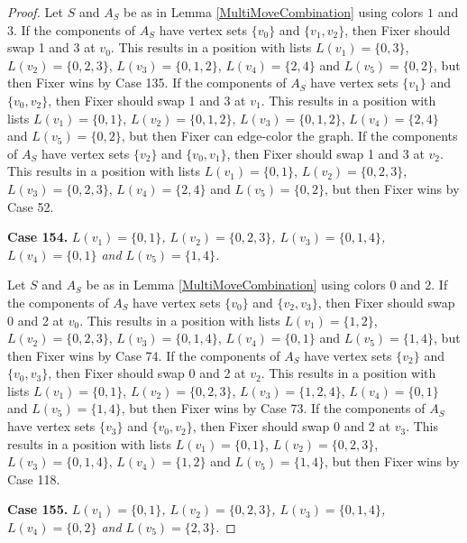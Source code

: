 \documentclass[12pt]{amsart}
\theoremstyle{plain}
\theoremstyle{definition}
\theoremstyle{remark}
\begin{document}
\begin{proof}
Let $S$ and $A_S$ be as in Lemma \ref{MultiMoveCombination} using colors $1$ and $3$. If the components of $A_S$ have vertex sets $\{v_0\}$ and $\{v_1, v_2\}$, then Fixer should swap 1 and 3 at $v_0$. This results in a position with lists $L(v_1) = \{0, 3\}$, $L(v_2) = \{0, 2, 3\}$, $L(v_3) = \{0, 1, 2\}$, $L(v_4) = \{2, 4\}$ and $L(v_5) = \{0, 2\}$, but then Fixer wins by Case 135.
If the components of $A_S$ have vertex sets $\{v_1\}$ and $\{v_0, v_2\}$, then Fixer should swap 1 and 3 at $v_1$. This results in a position with lists $L(v_1) = \{0, 1\}$, $L(v_2) = \{0, 1, 2\}$, $L(v_3) = \{0, 1, 2\}$, $L(v_4) = \{2, 4\}$ and $L(v_5) = \{0, 2\}$, but then Fixer can edge-color the graph.
If the components of $A_S$ have vertex sets $\{v_2\}$ and $\{v_0, v_1\}$, then Fixer should swap 1 and 3 at $v_2$. This results in a position with lists $L(v_1) = \{0, 1\}$, $L(v_2) = \{0, 2, 3\}$, $L(v_3) = \{0, 2, 3\}$, $L(v_4) = \{2, 4\}$ and $L(v_5) = \{0, 2\}$, but then Fixer wins by Case 52.

\noindent\textbf{Case 154.  }\textit{$L(v_1) = \{0, 1\}$, $L(v_2) = \{0, 2, 3\}$, $L(v_3) = \{0, 1, 4\}$, $L(v_4) = \{0, 1\}$ and $L(v_5) = \{1, 4\}$.}

Let $S$ and $A_S$ be as in Lemma \ref{MultiMoveCombination} using colors $0$ and $2$. If the components of $A_S$ have vertex sets $\{v_0\}$ and $\{v_2, v_3\}$, then Fixer should swap 0 and 2 at $v_0$. This results in a position with lists $L(v_1) = \{1, 2\}$, $L(v_2) = \{0, 2, 3\}$, $L(v_3) = \{0, 1, 4\}$, $L(v_4) = \{0, 1\}$ and $L(v_5) = \{1, 4\}$, but then Fixer wins by Case 74.
If the components of $A_S$ have vertex sets $\{v_2\}$ and $\{v_0, v_3\}$, then Fixer should swap 0 and 2 at $v_2$. This results in a position with lists $L(v_1) = \{0, 1\}$, $L(v_2) = \{0, 2, 3\}$, $L(v_3) = \{1, 2, 4\}$, $L(v_4) = \{0, 1\}$ and $L(v_5) = \{1, 4\}$, but then Fixer wins by Case 73.
If the components of $A_S$ have vertex sets $\{v_3\}$ and $\{v_0, v_2\}$, then Fixer should swap 0 and 2 at $v_3$. This results in a position with lists $L(v_1) = \{0, 1\}$, $L(v_2) = \{0, 2, 3\}$, $L(v_3) = \{0, 1, 4\}$, $L(v_4) = \{1, 2\}$ and $L(v_5) = \{1, 4\}$, but then Fixer wins by Case 118.

\noindent\textbf{Case 155.  }\textit{$L(v_1) = \{0, 1\}$, $L(v_2) = \{0, 2, 3\}$, $L(v_3) = \{0, 1, 4\}$, $L(v_4) = \{0, 2\}$ and $L(v_5) = \{2, 3\}$.}


\end{proof}
\end{document}
